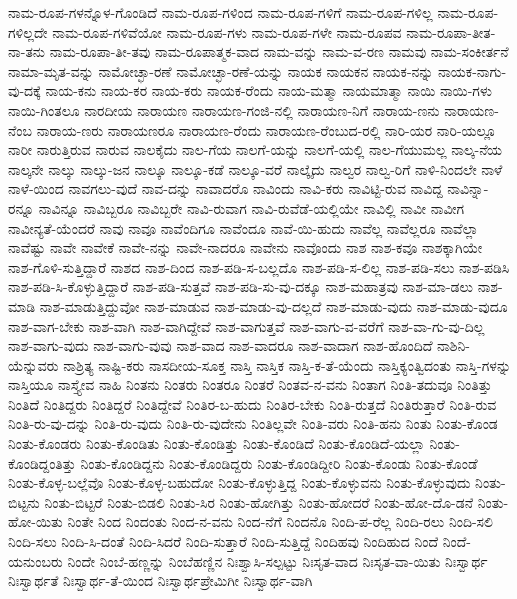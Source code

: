 ನಾಮ-ರೂಪ-ಗಳನ್ನೊಳ-ಗೊಂಡಿದೆ
ನಾಮ-ರೂಪ-ಗಳಿಂದ
ನಾಮ-ರೂಪ-ಗಳಿಗೆ
ನಾಮ-ರೂಪ-ಗಳಿಲ್ಲ
ನಾಮ-ರೂಪ-ಗಳಿಲ್ಲದೇ
ನಾಮ-ರೂಪ-ಗಳಿವೆಯೋ
ನಾಮ-ರೂಪ-ಗಳು
ನಾಮ-ರೂಪ-ಗಳೇ
ನಾಮ-ರೂಪವ
ನಾಮ-ರೂಪಾ-ತೀತ-ನಾ-ತನು
ನಾಮ-ರೂಪಾ-ತೀ-ತವು
ನಾಮ-ರೂಪಾತ್ಮಕ-ವಾದ
ನಾಮ-ವನ್ನು
ನಾಮ-ವ-ರಣ
ನಾಮವು
ನಾಮ-ಸಂಕೀರ್ತನೆ
ನಾಮಾ-ಮೃತ-ವನ್ನು
ನಾಮೋಚ್ಛಾ-ರಣೆ
ನಾಮೋಚ್ಛಾ-ರಣೆ-ಯನ್ನು
ನಾಯಕ
ನಾಯಕನ
ನಾಯಕ-ನನ್ನು
ನಾಯಕ-ನಾಗು-ವು-ದಕ್ಕೆ
ನಾಯ-ಕನು
ನಾಯ-ಕರ
ನಾಯ-ಕರು
ನಾಯಕ-ರೆಂದು
ನಾಯ-ಮತ್ಮಾ
ನಾಯಮಾತ್ಮಾ
ನಾಯಿ
ನಾಯಿ-ಗಳು
ನಾಯಿ-ಗಿಂತಲೂ
ನಾರದೀಯ
ನಾರಾಯಣ
ನಾರಾಯಣ-ಗಂಜಿ-ನಲ್ಲಿ
ನಾರಾಯಣ-ನಿಗೆ
ನಾರಾಯ-ಣನು
ನಾರಾಯಣ-ನೆಂಬ
ನಾರಾಯ-ಣರು
ನಾರಾಯಣರೂ
ನಾರಾಯಣ-ರೆಂದು
ನಾರಾಯಣ-ರೆಂಬುದ-ರಲ್ಲಿ
ನಾರಿ-ಯರ
ನಾರಿ-ಯಲ್ಲೂ
ನಾರೀ
ನಾರುತ್ತಿರುವ
ನಾರುವ
ನಾಲಕೈದು
ನಾಲ-ಗೆಯ
ನಾಲಗೆ-ಯನ್ನು
ನಾಲಗೆ-ಯಲ್ಲಿ
ನಾಲ-ಗೆಯುಮಲ್ಲ
ನಾಲ್ಕ-ನೆಯ
ನಾಲ್ಕನೇ
ನಾಲ್ಕು
ನಾಲ್ಕು-ಜನ
ನಾಲ್ಕೂ
ನಾಲ್ಕೂ-ಕಡೆ
ನಾಲ್ಕೂ-ವರೆ
ನಾಲ್ಕೈದು
ನಾಲ್ವರ
ನಾಲ್ವ-ರಿಗೆ
ನಾಳಿ-ನಿಂದಲೇ
ನಾಳೆ
ನಾಳೆ-ಯಿಂದ
ನಾವಗಲು-ವುದೆ
ನಾವ-ದನ್ನು
ನಾವಾದರೊ
ನಾವಿಂದು
ನಾವಿ-ಕರು
ನಾವಿಟ್ಟಿ-ರುವ
ನಾವಿದ್ದ
ನಾವಿನ್ನಾ-ರನ್ನೂ
ನಾವಿನ್ನೂ
ನಾವಿಬ್ಬರೂ
ನಾವಿಬ್ಬರೇ
ನಾವಿ-ರುವಾಗ
ನಾವಿ-ರುವೆಡೆ-ಯಲ್ಲಿಯೇ
ನಾವಿಲ್ಲಿ
ನಾವೀ
ನಾವೀಗ
ನಾವೀನ್ಯತೆ-ಯೆಂದರೆ
ನಾವು
ನಾವೂ
ನಾವೆಂದಿಗೂ
ನಾವೆಂದೂ
ನಾವೆ-ಯಿ-ಹುದು
ನಾವೆಲ್ಲ
ನಾವೆಲ್ಲರೂ
ನಾವೆಲ್ಲಾ
ನಾವೆಷ್ಟು
ನಾವೇ
ನಾವೇಕೆ
ನಾವೇ-ನನ್ನು
ನಾವೇ-ನಾದರೂ
ನಾವೇನು
ನಾವೊಂದು
ನಾಶ
ನಾಶ-ಕವೂ
ನಾಶಕ್ಕಾಗಿಯೇ
ನಾಶ-ಗೊಳಿ-ಸುತ್ತಿದ್ದಾರೆ
ನಾಶದ
ನಾಶ-ದಿಂದ
ನಾಶ-ಪಡಿ-ಸ-ಬಲ್ಲದೊ
ನಾಶ-ಪಡಿ-ಸ-ಲಿಲ್ಲ
ನಾಶ-ಪಡಿ-ಸಲು
ನಾಶ-ಪಡಿಸಿ
ನಾಶ-ಪಡಿ-ಸಿ-ಕೊಳ್ಳುತ್ತಿದ್ದಾರೆ
ನಾಶ-ಪಡಿ-ಸುತ್ತವೆ
ನಾಶ-ಪಡಿ-ಸು-ವು-ದಕ್ಕೂ
ನಾಶ-ಮಹಾತ್ರವು
ನಾಶ-ಮಾ-ಡಲು
ನಾಶ-ಮಾಡಿ
ನಾಶ-ಮಾಡುತ್ತಿದ್ದುವೋ
ನಾಶ-ಮಾಡುವ
ನಾಶ-ಮಾಡು-ವು-ದಲ್ಲದೆ
ನಾಶ-ಮಾಡು-ವುದು
ನಾಶ-ಮಾಡು-ವುದೂ
ನಾಶ-ವಾಗ-ಬೇಕು
ನಾಶ-ವಾಗಿ
ನಾಶ-ವಾಗಿದ್ದೇವೆ
ನಾಶ-ವಾಗುತ್ತವೆ
ನಾಶ-ವಾಗು-ವ-ವರೆಗೆ
ನಾಶ-ವಾ-ಗು-ವು-ದಿಲ್ಲ
ನಾಶ-ವಾಗು-ವುದು
ನಾಶ-ವಾಗು-ವುವು
ನಾಶ-ವಾದ
ನಾಶ-ವಾದರೂ
ನಾಶ-ವಾದಾಗ
ನಾಶ-ಹೊಂದಿದೆ
ನಾಶಿನಿ-ಯೆನ್ನುವರು
ನಾಶ್ರಿತ್ಯ
ನಾಷ್ಟಿ-ಕರು
ನಾಸದೀಯ-ಸೂಕ್ತ
ನಾಸ್ತಿ
ನಾಸ್ತಿಕ
ನಾಸ್ತಿ-ಕ-ತೆ-ಯೆಂದು
ನಾಸ್ತಿಕ್ಯಂತ್ವಿದಂತು
ನಾಸ್ತಿ-ಗಳನ್ನು
ನಾಸ್ತಿಯೂ
ನಾಸ್ತ್ಯೇವ
ನಾಹಿ
ನಿಂತನು
ನಿಂತರು
ನಿಂತರೂ
ನಿಂತರೆ
ನಿಂತವ-ನ-ವನು
ನಿಂತಾಗ
ನಿಂತಿ-ತದುವೂ
ನಿಂತಿತ್ತು
ನಿಂತಿದೆ
ನಿಂತಿದ್ದರು
ನಿಂತಿದ್ದರೆ
ನಿಂತಿದ್ದೇವೆ
ನಿಂತಿರ-ಬ-ಹುದು
ನಿಂತಿರ-ಬೇಕು
ನಿಂತಿ-ರುತ್ತದೆ
ನಿಂತಿರುತ್ತಾರೆ
ನಿಂತಿ-ರುವ
ನಿಂತಿ-ರು-ವು-ದನ್ನು
ನಿಂತಿ-ರು-ವುದು
ನಿಂತಿ-ರು-ವುದೇನು
ನಿಂತಿಲ್ಲವೇ
ನಿಂತಿ-ವರು
ನಿಂತಿ-ಹನು
ನಿಂತು
ನಿಂತು-ಕೊಂಡ
ನಿಂತು-ಕೊಂಡರು
ನಿಂತು-ಕೊಂಡಿತು
ನಿಂತು-ಕೊಂಡಿತ್ತು
ನಿಂತು-ಕೊಂಡಿದೆ
ನಿಂತು-ಕೊಂಡಿದೆ-ಯಲ್ಲಾ
ನಿಂತು-ಕೊಂಡಿದ್ದಂತಿತ್ತು
ನಿಂತು-ಕೊಂಡಿದ್ದನು
ನಿಂತು-ಕೊಂಡಿದ್ದರು
ನಿಂತು-ಕೊಂಡಿದ್ದೀರಿ
ನಿಂತು-ಕೊಂಡು
ನಿಂತು-ಕೊಂಡೆ
ನಿಂತು-ಕೊಳ್ಳ-ಬಲ್ಲೆವೊ
ನಿಂತು-ಕೊಳ್ಳ-ಬಹುದೋ
ನಿಂತು-ಕೊಳ್ಳುತ್ತಿದ್ದ
ನಿಂತು-ಕೊಳ್ಳುವನು
ನಿಂತು-ಕೊಳ್ಳುವುದು
ನಿಂತು-ಬಿಟ್ಟನು
ನಿಂತು-ಬಿಟ್ಟರೆ
ನಿಂತು-ಬಿಡಲಿ
ನಿಂತು-ಸಿರ
ನಿಂತು-ಹೋಗಿತ್ತು
ನಿಂತು-ಹೋದರೆ
ನಿಂತು-ಹೋ-ದೊ-ಡನೆ
ನಿಂತು-ಹೋ-ಯಿತು
ನಿಂತೇ
ನಿಂದ
ನಿಂದಂತು
ನಿಂದ-ನ-ವನು
ನಿಂದ-ನೆಗೆ
ನಿಂದನೊ
ನಿಂದಿ-ಪ-ರೆಲ್ಲ
ನಿಂದಿ-ರಲು
ನಿಂದಿ-ಸಲಿ
ನಿಂದಿ-ಸಲು
ನಿಂದಿ-ಸಿ-ದಂತೆ
ನಿಂದಿ-ಸಿದರೆ
ನಿಂದಿ-ಸುತ್ತಾರೆ
ನಿಂದಿ-ಸುತ್ತಿದ್ದೆ
ನಿಂದಿಹವು
ನಿಂದಿಹುದ
ನಿಂದೆ
ನಿಂದೆ-ಯನುಂಬರು
ನಿಂದೇ
ನಿಂಬೆ-ಹಣ್ಣನ್ನು
ನಿಂಬೆಹಣ್ಣಿನ
ನಿಃಶ್ವಾಸಿ-ಸಲ್ಪಟ್ಟು
ನಿಃಸೃತ-ವಾದ
ನಿಃಸೃತ-ವಾ-ಯಿತು
ನಿಃಸ್ವಾರ್ಥ
ನಿಃಸ್ವಾರ್ಥತೆ
ನಿಃಸ್ವಾರ್ಥ-ತೆ-ಯಿಂದ
ನಿಃಸ್ವಾರ್ಥಪ್ರೇಮಿಗೀ
ನಿಃಸ್ವಾರ್ಥ-ವಾಗಿ
